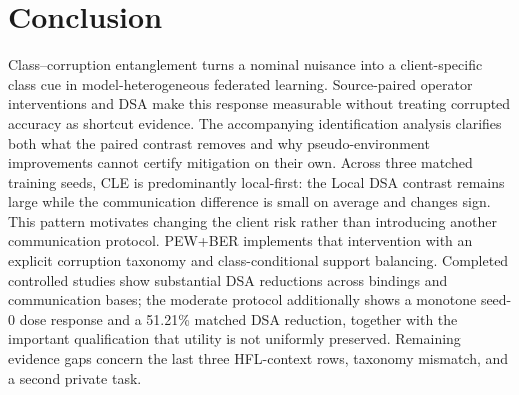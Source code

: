 \section{Conclusion}

Class--corruption entanglement turns a nominal nuisance into a client-specific class cue in model-heterogeneous federated learning. Source-paired operator interventions and DSA make this response measurable without treating corrupted accuracy as shortcut evidence. The accompanying identification analysis clarifies both what the paired contrast removes and why pseudo-environment improvements cannot certify mitigation on their own. Across three matched training seeds, CLE is predominantly local-first: the Local DSA contrast remains large while the communication difference is small on average and changes sign. This pattern motivates changing the client risk rather than introducing another communication protocol. PEW+BER implements that intervention with an explicit corruption taxonomy and class-conditional support balancing. Completed controlled studies show substantial DSA reductions across bindings and communication bases; the moderate protocol additionally shows a monotone seed-0 dose response and a 51.21\% matched DSA reduction, together with the important qualification that utility is not uniformly preserved. Remaining evidence gaps concern the last three HFL-context rows, taxonomy mismatch, and a second private task.
